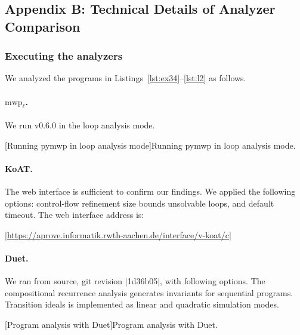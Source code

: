 \subsection{Appendix B: Technical Details of Analyzer Comparison}
\label{app:sec:comparison}

\subsubsection{Executing the analyzers}\label{subsec:analyzers}

We analyzed the programs in Listings~\ref{lst:ex34}--\ref{lst:l2} as follows.

\paragraph*{$\text{mwp}_\ell$.}
We run  v0.6.0 in the loop analysis mode.
\begin{center}
\begin{minipage}{\textwidth}
\captionsetup{type=lstlisting}
[Running pymwp in loop analysis mode]{Running pymwp in loop analysis mode.}
\label{lst:mwp-bash}
\end{minipage}
\end{center}

\paragraph*{KoAT.}
The  web interface is sufficient to confirm our findings.
We applied the following options:
\myok{ }control-flow refinement
\myok{ }size bounds
\myok{ }unsolvable loops, and default timeout.
The web interface address is:

\begin{center}
\href{https://aprove.informatik.rwth-aachen.de/interface/v-koat/c}%
{\pr|https://aprove.informatik.rwth-aachen.de/interface/v-koat/c|}
\end{center}

\paragraph*{Duet.}
We ran  from source, git revision \pr|1d36b05|, with following options.
The compositional recurrence analysis generates invariants for sequential programs.
Transition ideals is implemented as linear and quadratic simulation modes.
\begin{center}
\begin{minipage}{\textwidth}
\captionsetup{type=lstlisting}
[Program analysis with Duet]{Program analysis with Duet.}
\label{lst:duet-bash}
\end{minipage}
\end{center}

